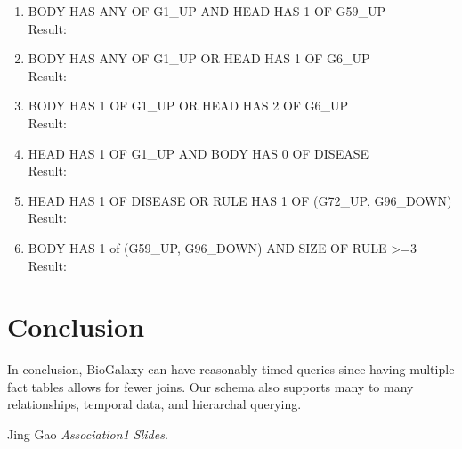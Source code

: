 \documentclass[12pt]{article}
\begin{document}
\begin{enumerate}
	\item  BODY HAS ANY OF G1\_UP AND HEAD HAS 1 OF G59\_UP \\
	Result: \\
	\item  BODY HAS ANY OF G1\_UP OR HEAD HAS 1 OF G6\_UP \\
	Result: \\
	\item  BODY HAS 1 OF G1\_UP OR HEAD HAS 2 OF G6\_UP \\
	Result: \\
	\item  HEAD HAS 1 OF G1\_UP AND BODY HAS 0 OF DISEASE \\
	Result: \\
	\item  HEAD HAS 1 OF DISEASE OR RULE HAS 1 OF (G72\_UP, G96\_DOWN) \\
	Result: \\
	\item  BODY HAS 1 of (G59\_UP, G96\_DOWN) AND SIZE OF RULE >=3 \\
	Result: \\
\end{enumerate}
\section*{Conclusion}

In conclusion, BioGalaxy can have reasonably timed queries since having multiple fact tables allows for fewer joins. Our schema also supports many to many relationships, temporal data, and hierarchal querying.






\begin{thebibliography}{9}
	Jing Gao
	\textit{Association1 Slides}. 

\end{thebibliography}
\end{document}
